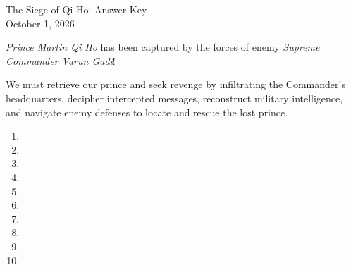\documentclass[11pt]{article}
\begin{document}
\begin{center}
  {\Large The Siege of Qi Ho: Answer Key}\\[3pt]
  October 1, 2026
\end{center}

\textit{Prince Martin Qi Ho} has been captured by the forces of enemy \textit{Supreme Commander Varun Gadi}!

\vspace{0.5cm}

We must retrieve our prince and seek revenge by infiltrating the Commander's headquarters, decipher intercepted messages, reconstruct military intelligence, and navigate enemy defenses to locate and rescue the lost prince. 

\begin{enumerate}

\item 

\item 

\item 

\item 

\item 

\item 

\item 

\item 

\item 

\item 

\end{enumerate}
\end{document}
